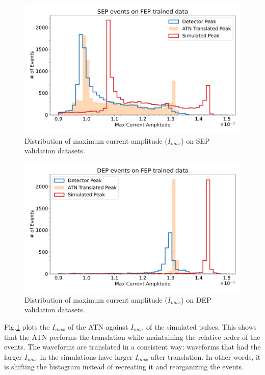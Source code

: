 \begin{figure}%
\centering
\includegraphics[width=0.9\linewidth,trim={0pc 0pc 0pc 0pc},clip]{ch8/figs/SEP_amp.pdf}
\caption{ Distribution of maximum current amplitude ($I_{max}$) on SEP validation datasets.}
\label{ch8_fig_current_amp_sep}
\end{figure}

\begin{figure}%
\centering
\includegraphics[width=0.9\linewidth,trim={0pc 0pc 0pc 0pc},clip]{ch8/figs/DEP_amp.pdf}
\caption{ Distribution of maximum current amplitude ($I_{max}$) on DEP validation datasets.}
\label{ch8_fig_current_amp_dep}
\end{figure}


Fig.\ref{ch8_fig_current_amp_sep} plots the $I_{max}$ of the ATN against $I_{max}$ of the simulated pulses. This shows that the ATN performs the translation while maintaining the relative order of the events. The waveforms are translated in a consistent way: waveforms that had the larger $I_{max}$ in the simulations have larger $I_{max}$ after translation. In other words, it is shifting the histogram instead of recreating it and reorganizing the events.

